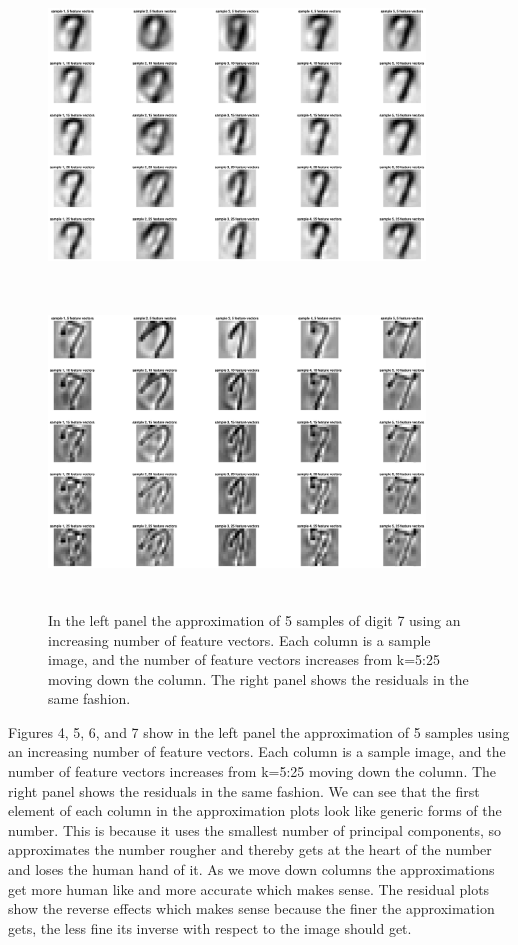 \documentclass{article}
\begin{document}
    \begin{figure}[!h]
        \centerline
        {
        \includegraphics[width=10cm, height=8cm] {Q_2_7_approx}\includegraphics[width=10cm, height=8cm]{Q_2_7_residual}
        }
        \caption{\label{fig:my figure}  In the left panel the approximation of 5 samples of digit 7 using an increasing number of feature vectors.  Each column is a sample image, and the number of feature vectors increases from k=5:25 moving down the column.  The right panel shows the residuals in the same fashion. }
    \end{figure}

Figures 4, 5, 6, and 7 show in the left panel the approximation of 5 samples using an increasing number of feature vectors.  Each column is a sample image, and the number of feature vectors increases from k=5:25 moving down the column.  The right panel shows the residuals in the same fashion.  We can see that the first element of each column in the approximation plots look like generic forms of the number.  This is because it uses the smallest number of principal components, so approximates the number rougher and thereby gets at the heart of the number and loses the human hand of it.  As we move down columns the approximations get more human like and more accurate which makes sense.  The residual plots show the reverse effects which makes sense because the finer the approximation gets, the less fine its inverse with respect to the image should get.
\end{document}
